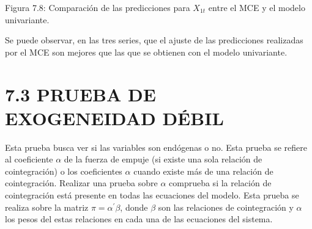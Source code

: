 \begin{center}
Figura 7.8: Comparaci\'{o}n de las predicciones para $X_{1t}$ entre el MCE y 
el modelo univariante.
\end{center}

Se puede observar, en las tres series, que el ajuste de las predicciones 
realizadas por el MCE son mejores que las que se obtienen con el modelo 
univariante.

\section{7.3 PRUEBA DE EXOGENEIDAD D\'{E}BIL}
\label{subsec:mylabel5}
Esta prueba busca ver si las variables 
son end\'{o}genas o no. Esta prueba se refiere al coeficiente $\alpha $ de 
la fuerza de empuje (si existe una sola relaci\'{o}n de cointegraci\'{o}n) o 
los coeficientes $\alpha $ cuando existe m\'{a}s de una relaci\'{o}n de 
cointegraci\'{o}n. Realizar una prueba sobre $\alpha $ comprueba si la 
relaci\'{o}n de cointegraci\'{o}n est\'{a} presente en todas las ecuaciones 
del modelo. Esta prueba se realiza sobre la matriz $\pi =\alpha^{'}\beta $, 
donde $\beta $ son las relaciones de cointegraci\'{o}n y $\alpha $ los pesos 
del estas relaciones en cada una de las ecuaciones del sistema.

